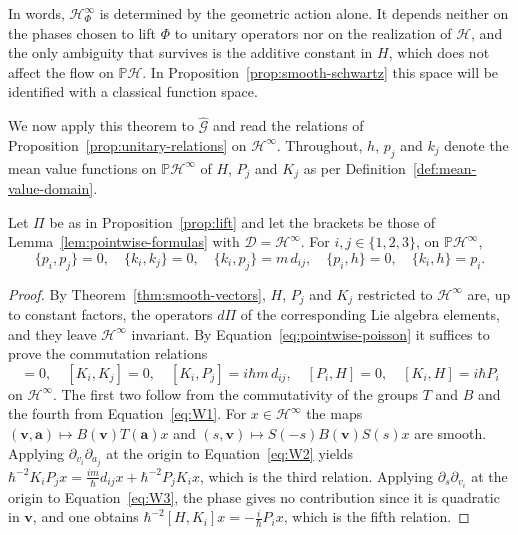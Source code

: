 \noindent In words, $\mathcal{H}^\infty_\Phi$ is determined by the geometric action alone. It depends neither on the phases chosen to lift $\Phi$ to unitary operators nor on the realization of $\mathcal{H}$, and the only ambiguity that survives is the additive constant in $H$, which does not affect the flow on $\mathbb{P}\mathcal{H}$. In Proposition~\ref{prop:smooth-schwartz} this space will be identified with a classical function space.

We now apply this theorem to $\widehat{\mathcal{G}}$ and read the relations of Proposition~\ref{prop:unitary-relations} on $\mathcal{H}^\infty$. Throughout, $h$, $p_j$ and $k_j$ denote the mean value functions on $\mathbb{P}\mathcal{H}^\infty$ of $H$, $P_j$ and $K_j$ as per Definition~\ref{def:mean-value-domain}.

\begin{proposition}\label{prop:galilean-poisson}
	Let $\Pi$ be as in Proposition~\ref{prop:lift} and let the brackets be those of Lemma~\ref{lem:pointwise-formulas} with $\mathcal{D}=\mathcal{H}^\infty$. For $i,j\in\{1,2,3\}$, on $\mathbb{P}\mathcal{H}^\infty$,
	\begin{equation}
		\{p_i,p_j\}=0,\quad \{k_i,k_j\}=0,\quad \{k_i,p_j\}=m\,d_{ij},\quad \{p_i,h\}=0,\quad \{k_i,h\}=p_i.
		\label{eq:galilean-poisson}
	\end{equation}
\end{proposition}

\begin{proof}
	By Theorem~\ref{thm:smooth-vectors}, $H$, $P_j$ and $K_j$ restricted to $\mathcal{H}^\infty$ are, up to constant factors, the operators $d\Pi$ of the corresponding Lie algebra elements, and they leave $\mathcal{H}^\infty$ invariant. By Equation~\eqref{eq:pointwise-poisson} it suffices to prove the commutation relations
	\begin{equation}
		[P_i,P_j]=0,\quad [K_i,K_j]=0,\quad [K_i,P_j]=i\hbar m\,d_{ij},\quad [P_i,H]=0,\quad [K_i,H]=i\hbar P_i
	\end{equation}
	on $\mathcal{H}^\infty$. The first two follow from the commutativity of the groups $T$ and $B$ and the fourth from Equation~\eqref{eq:W1}. For $x\in\mathcal{H}^\infty$ the maps $(\mathbf{v},\mathbf{a})\mapsto B(\mathbf{v})T(\mathbf{a})x$ and $(s,\mathbf{v})\mapsto S(-s)B(\mathbf{v})S(s)x$ are smooth. Applying $\partial_{v_i}\partial_{a_j}$ at the origin to Equation~\eqref{eq:W2} yields $\hbar^{-2}K_iP_jx=\tfrac{im}{\hbar}d_{ij}x+\hbar^{-2}P_jK_ix$, which is the third relation. Applying $\partial_s\partial_{v_i}$ at the origin to Equation~\eqref{eq:W3}, the phase gives no contribution since it is quadratic in $\mathbf{v}$, and one obtains $\hbar^{-2}[H,K_i]x=-\tfrac{i}{\hbar}P_ix$, which is the fifth relation.
\end{proof}

